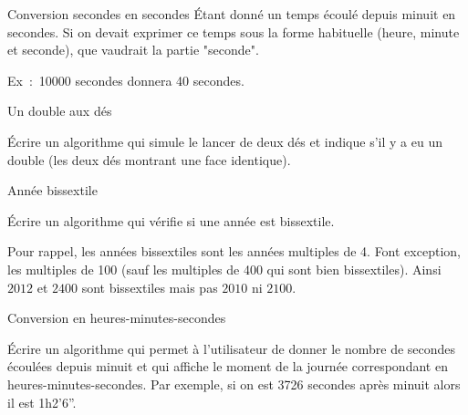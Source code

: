 	\begin{Exercice}{Conversion secondes en secondes}
		Étant donné un temps écoulé depuis minuit en secondes.
		Si on devait exprimer ce temps sous la forme
		habituelle (heure, minute et seconde),
		que vaudrait la partie "seconde".

		Ex~:~10000 secondes donnera 40 secondes.
	\end{Exercice}	

	\begin{Exercice}{Un double aux dés}

		Écrire un algorithme qui simule le lancer de deux dés
		et indique s’il y a eu un double 
		(les deux dés montrant une face identique).
	\end{Exercice}

	\begin{Exercice}{Année bissextile}

		\label{ex:bissextile}
		Écrire un algorithme qui vérifie si une année est bissextile.

		Pour rappel, les années bissextiles sont les années multiples de 4. 
		Font exception, les multiples de 100 
		(sauf les multiples de 400 qui sont bien bissextiles). 
		Ainsi $2012$ et $2400$ sont bissextiles mais pas $2010$ ni $2100$.
	\end{Exercice}



	\begin{Exercice}{Conversion en heures-minutes-secondes}

		Écrire un algorithme qui permet à l’utilisateur
		de donner le nombre de secondes écoulées depuis minuit
		et qui affiche le moment de la journée correspondant
		en heures-minutes-secondes.
		Par exemple, si on est 3726 secondes après minuit
		alors il est 1h2'6''.
	\end{Exercice}


